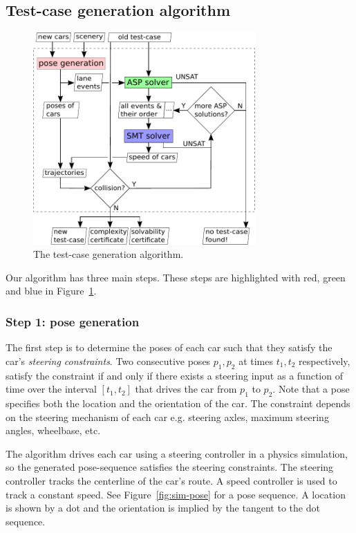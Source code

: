 \subsection{Test-case generation algorithm}

\begin{figure}
\centering
\includegraphics[width=85mm]{figures/chapter4/algorithm.pdf}%
\caption{The test-case generation algorithm.}
\label{fig:algorithm}%
\end{figure}

Our algorithm has three main steps.
%
These steps are highlighted with red, green and blue in Figure~\ref{fig:algorithm}.

\subsubsection{Step 1: pose generation}
The first step is to determine the poses of each car such that they satisfy the car's \emph{steering constraints}.
%
Two consecutive poses $p_1, p_2$ at times $t_1, t_2$ respectively, satisfy the constraint if and only if there exists a steering input as a function of time over the interval $[t_1, t_2]$ that drives the car from $p_1$ to $p_2$.
%
Note that a pose specifies both the location and the orientation of the car.
%
The constraint depends on the steering mechanism of each car e.g. steering axles, maximum steering angles, wheelbase, etc.

The algorithm drives each car using a steering controller in a physics simulation, so the generated pose-sequence satisfies the steering constraints.
%
The steering controller tracks the centerline of the car's route.
%
A speed controller is used to track a constant speed.
%
See Figure~\ref{fig:sim-pose} for a pose sequence.
%
A location is shown by a dot and the orientation is implied by the tangent to the dot sequence.

